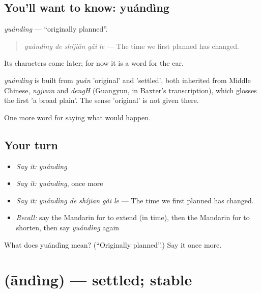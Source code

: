 \subsection*{You'll want to know: yuándìng}
\emph{yuándìng} — \textquotedblleft{}originally planned\textquotedblright{}.

\begin{quote}
\emph{yuándìng de shíjiān gǎi le} — The time we first planned has changed.
\end{quote}

Its characters come later; for now it is a word for the ear.

\begin{cousinweb}
\emph{yuándìng} is built from \emph{yuán} 'original' and  'settled', both inherited from Middle Chinese, \emph{ngjwon} and \emph{dengH} (Guangyun, in Baxter's transcription), which glosses the first 'a broad plain'. The sense 'original' is not given there.
\end{cousinweb}

\begin{grammarlens}[title={What you've built}]
One more word for saying what would happen.
\end{grammarlens}

\subsection*{Your turn}
\begin{itemize}
\raggedright
  \item \emph{Say it:} \emph{yuándìng}
  \item \emph{Say it:} \emph{yuándìng}, once more
  \item \emph{Say it:} \emph{yuándìng de shíjiān gǎi le} — The time we first planned has changed.
  \item \emph{Recall:} say the Mandarin for to extend (in time), then the Mandarin for to shorten, then say \emph{yuándìng} again
\end{itemize}

\begin{tcolorbox}[breakable,colback=teal!4,colframe=teal!35!black,title={Before you move on}]
What does yuándìng mean? (\textquotedblleft{}Originally planned\textquotedblright{}.) Say it once more.
\end{tcolorbox}
\section[\texorpdfstring{\zh{安定} (āndìng)}{安定 (āndìng)}]{ (āndìng) — settled; stable}

